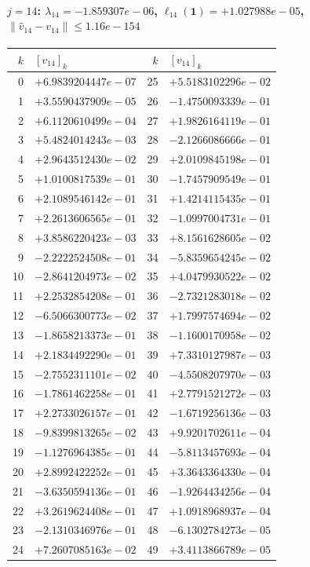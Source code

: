 \documentclass[11pt]{article}
\begin{document}
\paragraph{$j = 14$: $\lambda_{14} = -1.859307e-06$, \quad $\ell_{14}(\mathbf{1}) = +1.027988e-05$, \quad $\|\hat v_{14} - v_{14}\| \leq 1.16e-154$}
\begin{center}
{\footnotesize
\begin{tabular}{r@{\;\;}l@{\quad}r@{\;\;}l}
\toprule
$k$ & $[v_{14}]_k$ & $k$ & $[v_{14}]_k$ \\
\midrule
0 & $+6.9839204447e-07$ & 25 & $+5.5183102296e-02$ \\
1 & $+3.5590437909e-05$ & 26 & $-1.4750093339e-01$ \\
2 & $+6.1120610499e-04$ & 27 & $+1.9826164119e-01$ \\
3 & $+5.4824014243e-03$ & 28 & $-2.1266086666e-01$ \\
4 & $+2.9643512430e-02$ & 29 & $+2.0109845198e-01$ \\
5 & $+1.0100817539e-01$ & 30 & $-1.7457909549e-01$ \\
6 & $+2.1089546142e-01$ & 31 & $+1.4214115435e-01$ \\
7 & $+2.2613606565e-01$ & 32 & $-1.0997004731e-01$ \\
8 & $+3.8586220423e-03$ & 33 & $+8.1561628605e-02$ \\
9 & $-2.2222524508e-01$ & 34 & $-5.8359654245e-02$ \\
10 & $-2.8641204973e-02$ & 35 & $+4.0479930522e-02$ \\
11 & $+2.2532854208e-01$ & 36 & $-2.7321283018e-02$ \\
12 & $-6.5066300773e-02$ & 37 & $+1.7997574694e-02$ \\
13 & $-1.8658213373e-01$ & 38 & $-1.1600170958e-02$ \\
14 & $+2.1834492290e-01$ & 39 & $+7.3310127987e-03$ \\
15 & $-2.7552311101e-02$ & 40 & $-4.5508207970e-03$ \\
16 & $-1.7861462258e-01$ & 41 & $+2.7791521272e-03$ \\
17 & $+2.2733026157e-01$ & 42 & $-1.6719256136e-03$ \\
18 & $-9.8399813265e-02$ & 43 & $+9.9201702611e-04$ \\
19 & $-1.1276964385e-01$ & 44 & $-5.8113457693e-04$ \\
20 & $+2.8992422252e-01$ & 45 & $+3.3643364330e-04$ \\
21 & $-3.6350594136e-01$ & 46 & $-1.9264434256e-04$ \\
22 & $+3.2619624408e-01$ & 47 & $+1.0918968937e-04$ \\
23 & $-2.1310346976e-01$ & 48 & $-6.1302784273e-05$ \\
24 & $+7.2607085163e-02$ & 49 & $+3.4113866789e-05$ \\
\bottomrule
\end{tabular}
}
\end{center}
\end{document}
